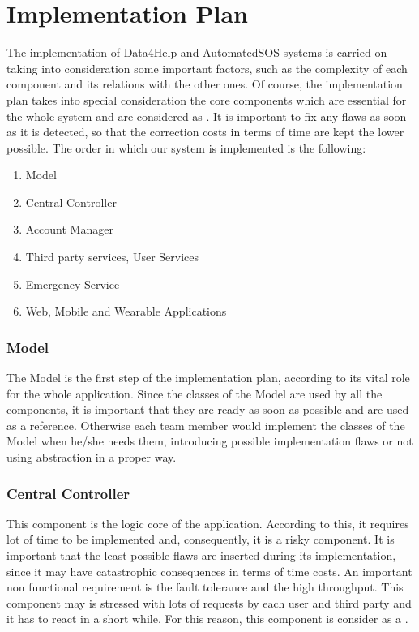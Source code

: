 \section{Implementation Plan}
The implementation of Data4Help and AutomatedSOS systems is carried on taking into consideration some important factors, such as the complexity of each component and its relations with the other ones. Of course, the implementation plan takes into special consideration the core components which are essential for the whole system and are considered as . 
It is important to fix any flaws as soon as it is detected, so that the correction costs in terms of time are kept the lower possible.
The order in which our system is implemented is the following:

\begin{enumerate}
    \item Model
    \item Central Controller
    \item Account Manager
    \item Third party services, User Services
    \item Emergency Service
    \item Web, Mobile and Wearable Applications
\end{enumerate}
\begin{figure}[H]
\end{figure}

\subsubsection{Model}
The Model is the first step of the implementation plan, according to its vital role for the whole application.
Since the classes of the Model are used by all the components, it is important that they are ready as soon as possible and are used as a reference. Otherwise each team member would implement the classes of the Model  when he/she needs them, introducing possible implementation flaws or not using abstraction in a proper way.

\subsubsection{Central Controller}
This component is the logic core of the application. According to this, it requires lot of time to be implemented and, consequently, it is a risky component. It is important that the least possible flaws are inserted during its implementation, since it may have catastrophic consequences in terms of time costs. An important non functional requirement is the fault tolerance and the high throughput. This component may is stressed with lots of requests by each user and third party and it has to react in a short while. For this reason, this component is consider as a .

